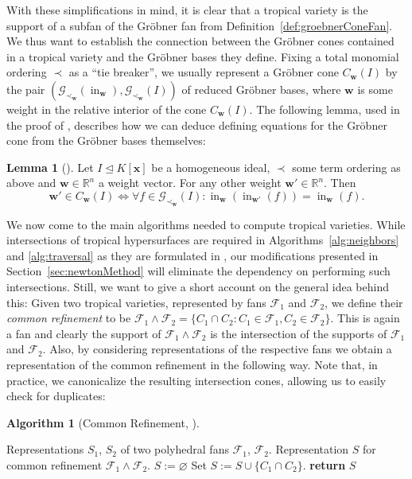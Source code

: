 \documentclass[
  paper=a4,
  titlepage,
  bibliography=totoc,
  pagesize=pdftex
]{scrartcl}
\numberwithin{figure}{section}
\numberwithin{equation}{section}
\numberwithin{table}{section}
\newcommand*\setR{\mathds{R}}
\let\vec\mathbf
\let\idealof\trianglelefteq
\DeclareMathOperator{\initial}{in}
\theoremstyle{definition}
\newtheorem{lemma}[definition]{Lemma}
\newtheorem{algo}[definition]{Algorithm}
\numberwithin{definition}{section}
\begin{document}
With these simplifications in mind, it is clear that a tropical variety is the support of
a subfan of the Gröbner fan from Definition~\ref{def:groebnerConeFan}. We thus want to
establish the connection between the Gröbner cones contained in a tropical variety and the
Gröbner bases they define. Fixing a total monomial ordering $\prec$ as a \enquote{tie
breaker}, we usually represent a Gröbner cone $C_{\vec w}(I)$ by the pair $(\mathcal
G_{\prec_{\vec w}}(\initial_{\vec w}), \mathcal G_{\prec_{\vec w}}(I))$ of reduced Gröbner
bases, where $\vec w$ is some weight in the relative interior of the cone $C_{\vec w}(I)$.
The following lemma, used in the proof of \cite[Proposition~2.3]{SturmGBCP}, describes how
we can deduce defining equations for the Gröbner cone from the Gröbner bases themselves:

\begin{lemma}[{\cite[Lemma~4.2]{compTropVar}}]
  \label{lem:grConEq}
  Let $I \idealof K[\vec x]$ be a homogeneous ideal, $\prec$ some term ordering as above
  and $\vec w \in \setR^n$ a weight vector. For any other weight $\vec w' \in \setR^n$.
  Then
  \[
    \vec w' \in C_{\vec w}(I) \iff
    \forall f \in \mathcal G_{\prec_{\vec w}}(I) :
    \initial_{\vec w}(\initial_{\vec w'}(f)) = \initial_{\vec w}(f).
  \]
\end{lemma}

We now come to the main algorithms needed to compute tropical varieties. While
intersections of tropical hypersurfaces are required in Algorithms~\ref{alg:neighbors} and
\ref{alg:traversal} as they are formulated in \cite[Section~4]{compTropVar}, our
modifications presented in Section~\ref{sec:newtonMethod} will eliminate the dependency on
performing such intersections. Still, we want to give a short account on the general idea
behind this: Given two tropical varieties, represented by fans $\mathcal F_1$ and
$\mathcal F_2$, we define their \emph{common refinement} to be $\mathcal F_1 \wedge
\mathcal F_2 = \{ C_1 \cap C_2 : C_1 \in \mathcal F_1, C_2 \in \mathcal F_2 \}$. This is
again a fan and clearly the support of $\mathcal F_1 \wedge \mathcal F_2$ is the
intersection of the supports of $\mathcal F_1$ and $\mathcal F_2$. Also, by considering
representations of the respective fans we obtain a representation of the common refinement
in the following way. Note that, in practice, we canonicalize the resulting intersection
cones, allowing us to easily check for duplicates:

\begin{algo}[Common Refinement, {\cite[Algorithm~4.4]{compTropVar}}]\
  \label{alg:fanRefinement}
  \begin{algorithmic}[1]
    \Require Representations $S_1$, $S_2$ of two polyhedral fans $\mathcal
      F_1$, $\mathcal F_2$.
    \Ensure Representation $S$ for common refinement $\mathcal F_1 \wedge \mathcal F_2$.
    \State $S := \varnothing$
      \State Set $S := S \cup \{ C_1 \cap C_2 \}$.
    \EndFor
    \State\textbf{return} $S$
  \end{algorithmic}
\end{algo}
\end{document}
